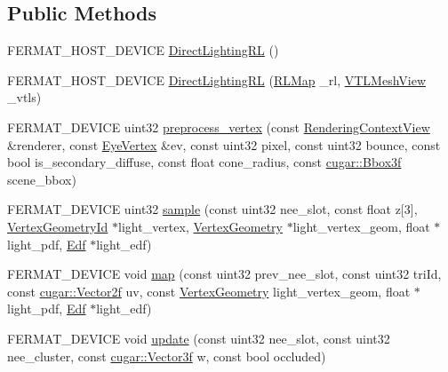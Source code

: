\subsection*{Public Methods}
\begin{DoxyCompactItemize}
\item 
F\+E\+R\+M\+A\+T\+\_\+\+H\+O\+S\+T\+\_\+\+D\+E\+V\+I\+CE \hyperlink{struct_direct_lighting_r_l_a4ffd83e2326fa69465a1f474ad7b9a82}{Direct\+Lighting\+RL} ()
\item 
F\+E\+R\+M\+A\+T\+\_\+\+H\+O\+S\+T\+\_\+\+D\+E\+V\+I\+CE \hyperlink{struct_direct_lighting_r_l_abbfe3a309d668177190c5dc5df992953}{Direct\+Lighting\+RL} (\hyperlink{struct_adaptive_clustered_r_l_view}{R\+L\+Map} \+\_\+rl, \hyperlink{struct_v_t_l_mesh_view}{V\+T\+L\+Mesh\+View} \+\_\+vtls)
\item 
F\+E\+R\+M\+A\+T\+\_\+\+D\+E\+V\+I\+CE uint32 \hyperlink{struct_direct_lighting_r_l_ab699ac7e5d3bfc88cef0849438334065}{preprocess\+\_\+vertex} (const \hyperlink{struct_rendering_context_view}{Rendering\+Context\+View} \&renderer, const \hyperlink{struct_eye_vertex}{Eye\+Vertex} \&ev, const uint32 pixel, const uint32 bounce, const bool is\+\_\+secondary\+\_\+diffuse, const float cone\+\_\+radius, const \hyperlink{structcugar_1_1_bbox}{cugar\+::\+Bbox3f} scene\+\_\+bbox)
\item 
F\+E\+R\+M\+A\+T\+\_\+\+D\+E\+V\+I\+CE uint32 \hyperlink{struct_direct_lighting_r_l_aa1f5e8005e659be71588e0ae72f5f79b}{sample} (const uint32 nee\+\_\+slot, const float z\mbox{[}3\mbox{]}, \hyperlink{struct_vertex_geometry_id}{Vertex\+Geometry\+Id} $\ast$light\+\_\+vertex, \hyperlink{struct_vertex_geometry}{Vertex\+Geometry} $\ast$light\+\_\+vertex\+\_\+geom, float $\ast$light\+\_\+pdf, \hyperlink{struct_edf}{Edf} $\ast$light\+\_\+edf)
\item 
F\+E\+R\+M\+A\+T\+\_\+\+D\+E\+V\+I\+CE void \hyperlink{struct_direct_lighting_r_l_ac763ae9503e0dbb78f5618c70446f2e7}{map} (const uint32 prev\+\_\+nee\+\_\+slot, const uint32 tri\+Id, const \hyperlink{structcugar_1_1_vector}{cugar\+::\+Vector2f} uv, const \hyperlink{struct_vertex_geometry}{Vertex\+Geometry} light\+\_\+vertex\+\_\+geom, float $\ast$light\+\_\+pdf, \hyperlink{struct_edf}{Edf} $\ast$light\+\_\+edf)
\item 
F\+E\+R\+M\+A\+T\+\_\+\+D\+E\+V\+I\+CE void \hyperlink{struct_direct_lighting_r_l_a466b9f6099b9332f1def390e45636b3a}{update} (const uint32 nee\+\_\+slot, const uint32 nee\+\_\+cluster, const \hyperlink{structcugar_1_1_vector}{cugar\+::\+Vector3f} w, const bool occluded)
\end{DoxyCompactItemize}
